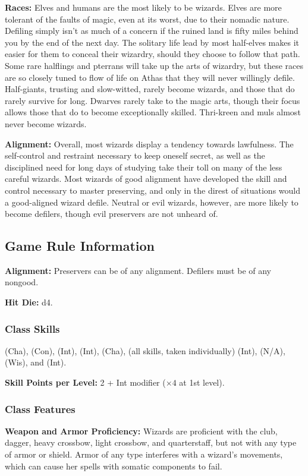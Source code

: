 \textbf{Races:} Elves and humans are the most likely to be wizards. Elves are more tolerant of the faults of magic, even at its worst, due to their nomadic nature. Defiling simply isn't as much of a concern if the ruined land is fifty miles behind you by the end of the next day. The solitary life lead by most half-elves makes it easier for them to conceal their wizardry, should they choose to follow that path. Some rare halflings and pterrans will take up the arts of wizardry, but these races are so closely tuned to flow of life on Athas that they will never willingly defile. Half-giants, trusting and slow-witted, rarely become wizards, and those that do rarely survive for long. Dwarves rarely take to the magic arts, though their focus allows those that do to become exceptionally skilled. Thri-kreen and muls almost never become wizards.

\textbf{Alignment:} Overall, most wizards display a tendency towards lawfulness. The self-control and restraint necessary to keep oneself secret, as well as the disciplined need for long days of studying take their toll on many of the less careful wizards. Most wizards of good alignment have developed the skill and control necessary to master preserving, and only in the direst of situations would a good-aligned wizard defile. Neutral or evil wizards, however, are more likely to become defilers, though evil preservers are not unheard of.

\subsection{Game Rule Information}

\textbf{Alignment:} Preservers can be of any alignment. Defilers must be of any nongood.

\textbf{Hit Die:} d4.

\subsubsection{Class Skills}
 (Cha),  (Con),  (Int),  (Int),  (Cha),  (all skills, taken individually) (Int),  (N/A),  (Wis), and  (Int).

\textbf{Skill Points per Level:} 2 + Int modifier ($\times4$ at 1st level).

\subsubsection{Class Features}
\textbf{Weapon and Armor Proficiency:} Wizards are proficient with the club, dagger, heavy crossbow, light crossbow, and quarterstaff, but not with any type of armor or shield. Armor of any type interferes with a wizard's movements, which can cause her spells with somatic components to fail.

